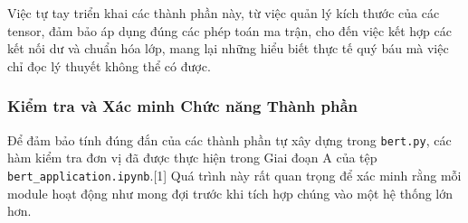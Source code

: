 Việc tự tay triển khai các thành phần này, từ việc quản lý kích thước của các tensor, đảm bảo áp dụng đúng các phép toán ma trận, cho đến việc kết hợp các kết nối dư và chuẩn hóa lớp, mang lại những hiểu biết thực tế quý báu mà việc chỉ đọc lý thuyết không thể có được.

\subsubsection{Kiểm tra và Xác minh Chức năng Thành phần}
\label{sssec:kiem_tra_xac_minh_thanh_phan_rewrite}
Để đảm bảo tính đúng đắn của các thành phần tự xây dựng trong \texttt{bert.py}, các hàm kiểm tra đơn vị đã được thực hiện trong Giai đoạn A của tệp \texttt{bert\_application.ipynb}.[1] Quá trình này rất quan trọng để xác minh rằng mỗi module hoạt động như mong đợi trước khi tích hợp chúng vào một hệ thống lớn hơn.

